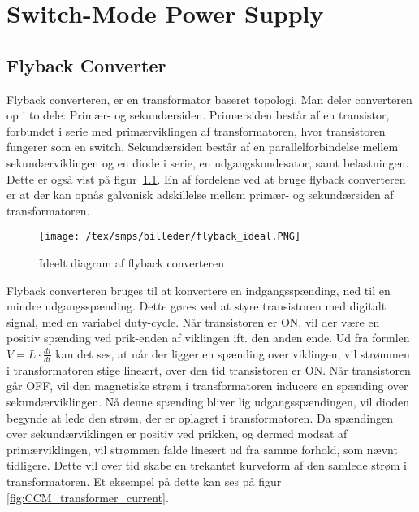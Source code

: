
\chapter{Switch-Mode Power Supply}

\section{Flyback Converter}
Flyback converteren, er en transformator baseret topologi. Man deler converteren op i to dele: Primær- og sekundærsiden. Primærsiden består af en transistor, forbundet i serie med primærviklingen af transformatoren, hvor transistoren fungerer som en switch. Sekundærsiden består af en parallelforbindelse mellem sekundærviklingen og en diode i serie, en udgangskondesator, samt belastningen. Dette er også vist på figur~\ref{fig:flyback_ideal}. En af fordelene ved at bruge flyback converteren er at der kan opnås galvanisk adskillelse mellem primær- og sekundærsiden af transformatoren. 

\begin{figure}[H]
	\center
	\texttt{[image: /tex/smps/billeder/flyback\_ideal.PNG]}
	\caption{Ideelt diagram af flyback converteren
	\cite{SMPS-topologies}}
	\label{fig:flyback_ideal}
\end{figure} 

\noindent Flyback converteren bruges til at konvertere en indgangsspænding, ned til en mindre udgangsspænding. Dette gøres ved at styre transistoren med digitalt signal, med en variabel duty-cycle. Når transistoren er ON, vil der være en positiv spænding ved prik-enden af viklingen ift. den anden ende. Ud fra formlen $V=L\cdot \frac{di}{dt}$ kan det ses, at når der ligger en spænding over viklingen, vil strømmen i transformatoren stige lineært, over den tid transistoren er ON. Når transistoren går OFF, vil den magnetiske strøm i transformatoren inducere en spænding over sekundærviklingen. Nå denne spænding bliver lig udgangsspændingen, vil dioden begynde at lede den strøm, der er oplagret i transformatoren. Da spændingen over sekundærviklingen er positiv ved prikken, og dermed modsat af primærviklingen, vil strømmen falde lineært ud fra samme forhold, som nævnt tidligere. Dette vil over tid skabe en trekantet kurveform af den samlede strøm i transformatoren. Et eksempel på dette kan ses på figur \ref{fig:CCM_transformer_current}.

